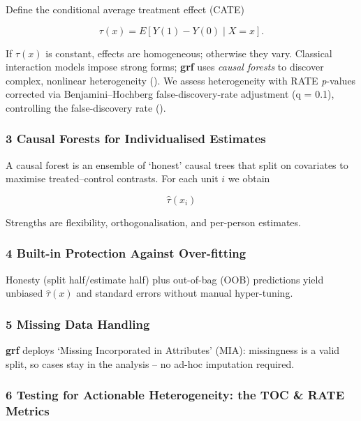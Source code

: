 \documentclass[
  single column]{article}
\begin{document}
Define the conditional average treatment effect (CATE)

\[
  \tau(x)=E[Y(1)-Y(0)\mid X=x].
\]

If \(\tau(x)\) is constant, effects are homogeneous; otherwise they
vary. Classical interaction models impose strong forms; \textbf{grf}
uses \emph{causal forests} to discover complex, nonlinear heterogeneity
(). We assess
heterogeneity with RATE \emph{p}-values corrected via
Benjamini--Hochberg false-discovery-rate adjustment (q = 0.1),
controlling the false-discovery rate
().

\subsubsection{3 Causal Forests for Individualised
Estimates}\label{causal-forests-for-individualised-estimates}

A causal forest is an ensemble of `honest' causal trees that split on
covariates to maximise treated--control contrasts. For each unit \(i\)
we obtain

\[
  \widehat{\tau}(x_i)
\]

Strengths are flexibility, orthogonalisation, and per-person estimates.

\subsubsection{4 Built-in Protection Against
Over-fitting}\label{built-in-protection-against-over-fitting}

Honesty (split half/estimate half) plus out-of-bag (OOB) predictions
yield unbiased \(\widehat{\tau}(x)\) and standard errors without manual
hyper-tuning.

\subsubsection{5 Missing Data Handling}\label{missing-data-handling}

\textbf{grf} deploys `Missing Incorporated in Attributes' (MIA):
missingness is a valid split, so cases stay in the analysis -- no ad-hoc
imputation required.

\subsubsection{\texorpdfstring{6 Testing for \textbf{Actionable}
Heterogeneity: the TOC \& RATE
Metrics}{6 Testing for Actionable Heterogeneity: the TOC \& RATE Metrics}}\label{testing-for-actionable-heterogeneity-the-toc-rate-metrics}
\end{document}

